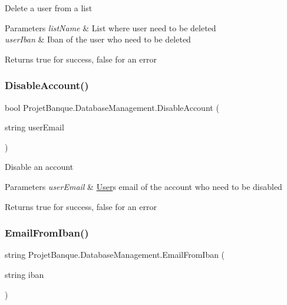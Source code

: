 Delete a user from a list 


\begin{DoxyParams}{Parameters}
{\em list\+Name} & List where user need to be deleted\\
\hline
{\em user\+Iban} & Iban of the user who need to be deleted\\
\hline
\end{DoxyParams}
\begin{DoxyReturn}{Returns}
true for success, false for an error
\end{DoxyReturn}
\mbox{\label{class_projet_banque_1_1_database_management_a0754fcad4a15737c428c29e2f08abfdb}} 
\subsubsection{\texorpdfstring{DisableAccount()}{DisableAccount()}}
{\footnotesize\ttfamily bool Projet\+Banque.\+Database\+Management.\+Disable\+Account (\begin{DoxyParamCaption}\item[{string}]{user\+Email }\end{DoxyParamCaption})}



Disable an account 


\begin{DoxyParams}{Parameters}
{\em user\+Email} & \mbox{\hyperlink{class_projet_banque_1_1_user}{User}}\textquotesingle{}s email of the account who need to be disabled\\
\hline
\end{DoxyParams}
\begin{DoxyReturn}{Returns}
true for success, false for an error
\end{DoxyReturn}
\mbox{\label{class_projet_banque_1_1_database_management_a15437c7a1ca0d2319481df7c14d2f2e2}} 
\subsubsection{\texorpdfstring{EmailFromIban()}{EmailFromIban()}}
{\footnotesize\ttfamily string Projet\+Banque.\+Database\+Management.\+Email\+From\+Iban (\begin{DoxyParamCaption}\item[{string}]{iban }\end{DoxyParamCaption})}



